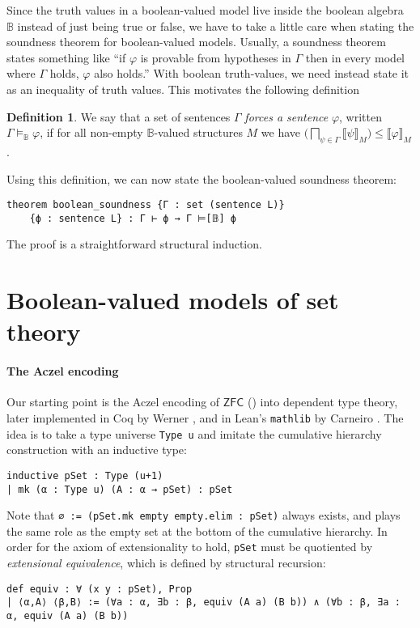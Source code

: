 \documentclass[sigplan,10pt,review, anonymous]{acmart}
\newcommand{\B}{\mathbb{B}}
\theoremstyle{definition}
\newtheorem{defn}{Definition}[section]
\begin{document}
Since the truth values in a boolean-valued model live inside the boolean algebra $\B$ instead of just being true or false, we have to take a little care when stating the soundness theorem for boolean-valued models.
Usually, a soundness theorem states something like ``if $\varphi$ is provable from hypotheses in $\Gamma$ then in every model where $\Gamma$ holds, $\varphi$ also holds.''
With boolean truth-values, we need instead state it as an inequality of truth values. This motivates the following definition
\begin{defn}
We say that a set of sentences $\Gamma$ \emph{forces a sentence} $\varphi$, written $\Gamma \models_{\B}\varphi$, if for all non-empty $\B$-valued structures $M$ we have $\big(\bigsqcap_{\psi\in\Gamma}\big \llbracket \psi \rrbracket_M)\le\llbracket \varphi \rrbracket_M$.
\end{defn}
Using this definition, we can now state the boolean-valued soundness theorem:
\begin{lstlisting}
theorem boolean_soundness {Γ : set (sentence L)}
    {ϕ : sentence L} : Γ ⊢ ϕ → Γ ⊨[𝔹] ϕ
\end{lstlisting}
The proof is a straightforward structural induction.

\section{Boolean-valued models of set theory}
\label{section:bset}
\paragraph{The Aczel encoding}
Our starting point is the Aczel encoding of \(\mathsf{ZFC}\) (\cite{aczel1978type, aczel1986type, aczel1982type}) into dependent type theory, later implemented in Coq by Werner \cite{werner1997sets}, and in Lean's \lstinline{mathlib} by Carneiro \cite{mario1}. The idea is to take a type universe \lstinline{Type u} and imitate the cumulative hierarchy construction with an inductive type:
\begin{lstlisting}
inductive pSet : Type (u+1)
| mk (α : Type u) (A : α → pSet) : pSet
\end{lstlisting}
Note that \lstinline{∅ := (pSet.mk empty empty.elim : pSet)} always exists, and plays the same role as the empty set at the bottom of the cumulative hierarchy. In order for the axiom of extensionality to hold, \lstinline{pSet} must be quotiented by \emph{extensional equivalence}, which is defined by structural recursion:
\begin{lstlisting}[basicstyle=\ttfamily\small]
def equiv : ∀ (x y : pSet), Prop
| ⟨α,A⟩ ⟨β,B⟩ := (∀a : α, ∃b : β, equiv (A a) (B b)) ∧ (∀b : β, ∃a : α, equiv (A a) (B b))
\end{lstlisting}
\end{document}
